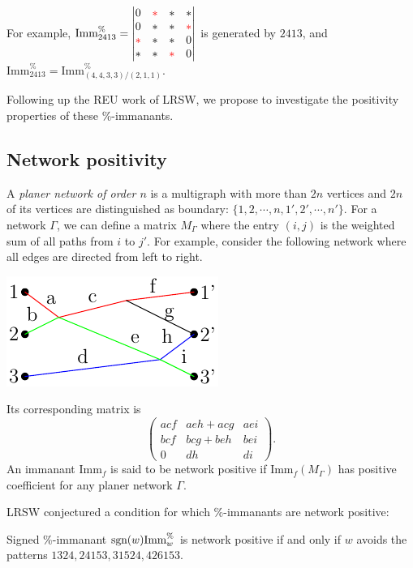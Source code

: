 \documentclass{paper}
\newcommand{\imm}[0]{\text{Imm}}
\newcommand{\redx}[0]{{\color{red}*}}
\begin{document}
 For example, $\imm^\%_{2413} = \begin{vmatrix}
            0 & \redx & * & * \\
            0 & * & * & \redx \\
            \redx & * & * & 0 \\
            * & * & \redx & 0 \\
        \end{vmatrix}$
        is generated by $2413$, and $\imm^\%_{2413}=\imm^\%_{(4,4,3,3)/(2,1,1) }$.
        
        Following up the REU work of LRSW, we propose to investigate the positivity properties of these \%-immanants.
        
        \subsection{Network positivity}
        A \emph{planer network of order $n$} is a multigraph with more than $2n$ vertices and $2n$ of its vertices are distinguished as boundary: $\{1,2,\cdots,n,1',2',\cdots,n'\}$. For a network $\Gamma$, we can define a matrix $M_\Gamma$ where the entry $(i,j)$ is the weighted sum of all paths from $i$ to $j'$. For example, consider the following network where all edges are directed from left to right.
        \begin{center}
    \includegraphics[]{output 20.pdf}
\end{center}
Its corresponding matrix is 
$$\begin{pmatrix} acf & aeh + acg & aei\\ bcf & bcg + beh & bei \\ 0 & dh & di\end{pmatrix}.$$
An immanant $\imm_f$ is said to be network positive if $\imm_f(M_\Gamma)$ has positive coefficient for any planer network $\Gamma$.

LRSW conjectured a condition for which $\%$-immanants are network positive:
\begin{conjecture} Signed \%-immanant
$\textup{sgn}(w)\imm_w^{\%}$ is network positive if and only if $w$
	avoids the patterns $1324, 24153, 31524, 426153.$
\end{conjecture} 
\end{document}
